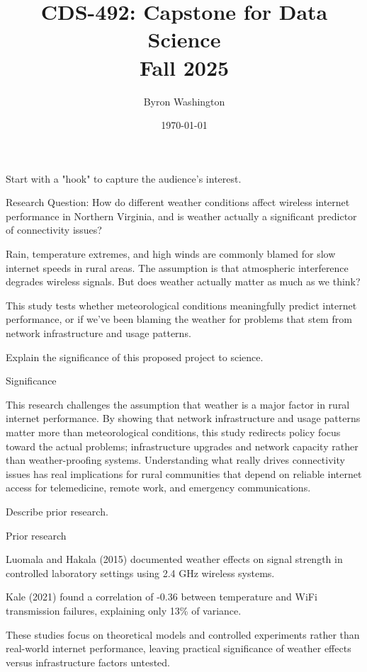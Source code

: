 \documentclass[clock,final,landscape,letterpaper]{slides}
\begin{document}
\title{CDS-492:  Capstone for Data Science \\ Fall 2025}
\author{Byron Washington}
\date{\today}
\maketitle

\begin{note}
  Start with a "hook" to capture the audience's interest.
\end{note}
\begin{slide}
Research Question: How do different weather conditions affect wireless internet performance in Northern Virginia, and is weather actually a significant predictor of connectivity issues?

Rain, temperature extremes, and high winds are commonly blamed for slow internet speeds in rural areas. The assumption is that atmospheric interference degrades wireless signals. But does weather actually matter as much as we think? 

This study tests whether meteorological conditions meaningfully predict internet performance, or if we've been blaming the weather for problems that stem from network infrastructure and usage patterns.
\end{slide}

\begin{note}
  Explain the significance of this proposed project to science.
\end{note}
\begin{slide}
Significance

This research challenges the assumption that weather is a major factor in rural internet performance. By showing that network infrastructure and usage patterns matter more than meteorological conditions, this study redirects policy focus toward the actual problems; infrastructure upgrades and network capacity rather than weather-proofing systems. Understanding what really drives connectivity issues has real implications for rural communities that depend on reliable internet access for telemedicine, remote work, and emergency communications.

\end{slide}

\begin{note}
  Describe prior research.
\end{note}
\begin{slide}
Prior research
  
Luomala and Hakala (2015) documented weather effects on signal strength in controlled laboratory settings using 2.4 GHz wireless systems. 

Kale (2021) found a correlation of -0.36 between temperature and WiFi transmission failures, explaining only 13\% of variance.

These studies focus on theoretical models and controlled experiments rather than real-world internet performance, leaving practical significance of weather effects versus infrastructure factors untested.

\end{slide}
\end{document}
